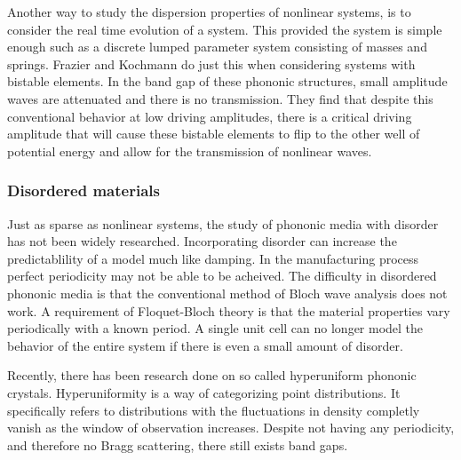 \documentclass{article}
\begin{document}
Another way to study the dispersion properties of nonlinear systems, is to 
consider the real time evolution of a system. This provided the system is 
simple enough such as a discrete lumped parameter system consisting of masses 
and springs. Frazier and Kochmann do just this when considering systems with 
bistable elements. In the band gap of these phononic structures, small 
amplitude waves are attenuated and there is no transmission. They find that 
despite this conventional behavior at low driving amplitudes, there is a 
critical driving amplitude that will cause these bistable elements to flip to 
the other well of potential energy and allow for the transmission of nonlinear 
waves.


\subsubsection{Disordered materials}
Just as sparse as nonlinear systems, the study of phononic media with disorder 
has not been widely researched. Incorporating disorder can increase the 
predictablility of a model much like damping. In the manufacturing process 
perfect periodicity may not be able to be acheived. The difficulty in 
disordered phononic media is that the conventional method of Bloch wave 
analysis does not work. A requirement of Floquet-Bloch theory is that the 
material properties vary periodically with a known period. A single unit cell 
can no longer model the behavior of the entire system if there is even a small 
amount of disorder.

Recently, there has been research done on so called hyperuniform phononic 
crystals. Hyperuniformity is a way of categorizing point distributions. It 
specifically refers to distributions with the fluctuations in density completly 
vanish as the window of observation increases. Despite not having any 
periodicity, and therefore no Bragg scattering, there still exists band gaps.
\end{document}
